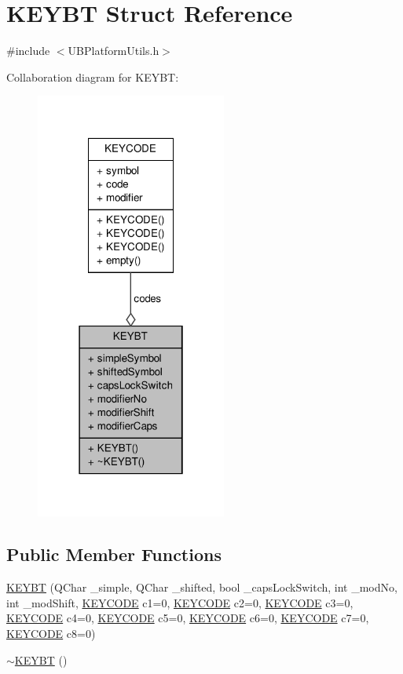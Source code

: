 \hypertarget{struct_k_e_y_b_t}{\section{K\-E\-Y\-B\-T Struct Reference}
\label{d3/dd2/struct_k_e_y_b_t}
}


{\ttfamily \#include $<$U\-B\-Platform\-Utils.\-h$>$}



Collaboration diagram for K\-E\-Y\-B\-T\-:
\nopagebreak
\begin{figure}[H]
\begin{center}
\leavevmode
\includegraphics[width=178pt]{de/da3/struct_k_e_y_b_t__coll__graph}
\end{center}
\end{figure}
\subsection*{Public Member Functions}
\begin{DoxyCompactItemize}
\item 
\hyperlink{struct_k_e_y_b_t_a95fb25ac54afe9c69e4225fb0c9e62c7}{K\-E\-Y\-B\-T} (Q\-Char \-\_\-simple, Q\-Char \-\_\-shifted, bool \-\_\-caps\-Lock\-Switch, int \-\_\-mod\-No, int \-\_\-mod\-Shift, \hyperlink{struct_k_e_y_c_o_d_e}{K\-E\-Y\-C\-O\-D\-E} c1=0, \hyperlink{struct_k_e_y_c_o_d_e}{K\-E\-Y\-C\-O\-D\-E} c2=0, \hyperlink{struct_k_e_y_c_o_d_e}{K\-E\-Y\-C\-O\-D\-E} c3=0, \hyperlink{struct_k_e_y_c_o_d_e}{K\-E\-Y\-C\-O\-D\-E} c4=0, \hyperlink{struct_k_e_y_c_o_d_e}{K\-E\-Y\-C\-O\-D\-E} c5=0, \hyperlink{struct_k_e_y_c_o_d_e}{K\-E\-Y\-C\-O\-D\-E} c6=0, \hyperlink{struct_k_e_y_c_o_d_e}{K\-E\-Y\-C\-O\-D\-E} c7=0, \hyperlink{struct_k_e_y_c_o_d_e}{K\-E\-Y\-C\-O\-D\-E} c8=0)
\item 
\hyperlink{struct_k_e_y_b_t_a768c5283e9315bfad6416c4fd015c4da}{$\sim$\-K\-E\-Y\-B\-T} ()
\end{DoxyCompactItemize}
